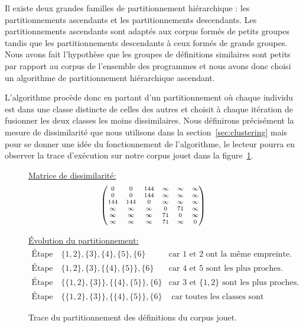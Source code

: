 Il existe deux grandes familles de partitionnement hiérarchique : les
partitionnements ascendants et les partitionnements descendants. Les
partitionnements ascendants sont adaptés aux corpus formés de petits
groupes tandis que les partitionnements descendants à ceux formés de
grands groupes. Nous avons fait l'hypothèse que les groupes de
définitions similaires sont petits par rapport au corpus de l'ensemble
des programmes {\OCaml} et nous avons donc choisi un algorithme de
partitionnement hiérarchique ascendant.

L'algorithme procède donc en partant d'un partitionnement où chaque
individu est dans une classe distincte de celles des autres et choisit
à chaque itération de fusionner les deux classes les moins
dissimilaires. Nous définirons précisément la mesure de dissimilarité
que nous utilisons dans la section~\ref{sec:clustering} mais pour
se donner une idée du fonctionnement de l'algorithme, le lecteur
pourra en observer la trace d'exécution sur notre corpus jouet
dans la figure~\ref{fig:clustering-jouet}.

\begin{figure}
\underline{Matrice de dissimilarité:}
\[\scriptsize
\begin{pmatrix}
0 & 0 & 144 & \infty & \infty & \infty \\
0 & 0 & 144 & \infty & \infty & \infty \\
144 & 144 & 0 & \infty & \infty & \infty \\
\infty & \infty & \infty & 0 & 71 & \infty \\
\infty & \infty & \infty & 71 & 0 & \infty \\
\infty & \infty & \infty & 71 & \infty & 0 \\
\end{pmatrix}
\]

\underline{Évolution du partitionnement:}
\[
\begin{array}{rclr}
\text{Étape 1} & \{ 1, 2 \}, \{ 3 \}, \{ 4 \}, \{ 5 \}, \{ 6 \}
& \text{car }1 \text{ et } 2 \text{ ont la même empreinte.} \\
\text{Étape 2} & \{ 1, 2 \}, \{ 3 \}, \{ \{ 4 \}, \{ 5 \} \}, \{ 6 \}
& \text{car }4 \text{ et } 5 \text{ sont les plus proches.} \\
\text{Étape 3} & \{ \{ 1, 2 \}, \{ 3 \} \}, \{ \{ 4 \}, \{ 5 \} \}, \{ 6 \}
& \text{car }3 \text{ et } \{ 1, 2 \} \text{ sont les plus proches.} \\
\text{Étape 4} & \{ \{ 1, 2 \}, \{ 3 \} \}, \{ \{ 4 \}, \{ 5 \} \}, \{ 6 \}
& \text{ car toutes les classes sont absolument dissimilaires.}
\end{array}
\]

\caption{Trace du partitionnement des définitions du corpus jouet.}
\label{fig:clustering-jouet}
\end{figure}

